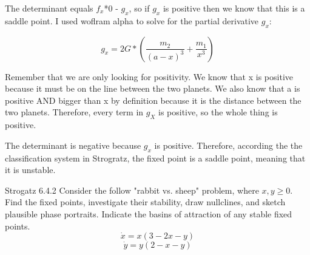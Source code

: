 \documentclass[11pt,answers]{exam}
\begin{document}
\begin{questions}
\begin{solution}
The determinant equals $f_x$*0 - $g_x$, so if $g_x$ is positive then we know that this is a saddle point. I used woflram alpha to solve for the partial derivative $g_x$:

$$g_x = 2G*(\frac{m_2}{(a-x)^3} +\frac{m_1}{x^3})$$

Remember that we are only looking for positivity. We know that x is positive because it must be on the line between the two planets. We also know that a is positive AND bigger than x by definition because it is the distance between the two planets. Therefore, every term in $g_X$ is positive, so the whole thing is positive.

The determinant is negative because $g_x$ is positive. Therefore, according the the classification system in Strogratz, the fixed point is a saddle point, meaning that it is unstable.

\end{solution}

\item Strogatz 6.4.2 Consider the follow "rabbit vs. sheep" problem, where $x,y \geq 0$. Find the fixed points, investigate their stability, draw nullclines, and sketch plausible phase portraits. Indicate the basins of attraction of any stable fixed points. 
\begin{equation}
\dot{x} = x(3-2x-y)
\end{equation}
\begin{equation}
\dot{y} = y(2-x-y)
\end{equation}


\end{questions}
\end{document}
